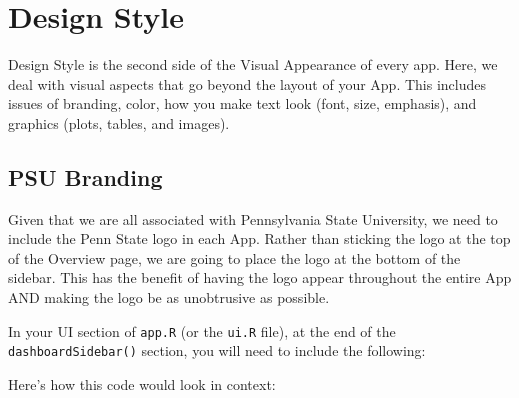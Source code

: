 \documentclass[
]{book}
\newenvironment{Shaded}{\begin{snugshade}}{\end{snugshade}}
\newcommand{\DataTypeTok}[1]{\textcolor[rgb]{0.13,0.29,0.53}{#1}}
\newcommand{\KeywordTok}[1]{\textcolor[rgb]{0.13,0.29,0.53}{\textbf{#1}}}
\newcommand{\NormalTok}[1]{#1}
\newcommand{\OperatorTok}[1]{\textcolor[rgb]{0.81,0.36,0.00}{\textbf{#1}}}
\newcommand{\StringTok}[1]{\textcolor[rgb]{0.31,0.60,0.02}{#1}}
\begin{document}
\hypertarget{designStyle}{%
\chapter{Design Style}\label{designStyle}}

Design Style is the second side of the Visual Appearance of every app. Here, we deal with visual aspects that go beyond the layout of your App. This includes issues of branding, color, how you make text look (font, size, emphasis), and graphics (plots, tables, and images).

\hypertarget{logo}{%
\section{PSU Branding}\label{logo}}

Given that we are all associated with Pennsylvania State University, we need to include the Penn State logo in each App. Rather than sticking the logo at the top of the Overview page, we are going to place the logo at the bottom of the sidebar. This has the benefit of having the logo appear throughout the entire App AND making the logo be as unobtrusive as possible.

In your UI section of \texttt{app.R} (or the \texttt{ui.R} file), at the end of the \texttt{dashboardSidebar()} section, you will need to include the following:

\begin{Shaded}
\end{Shaded}

Here's how this code would look in context:
\end{document}
